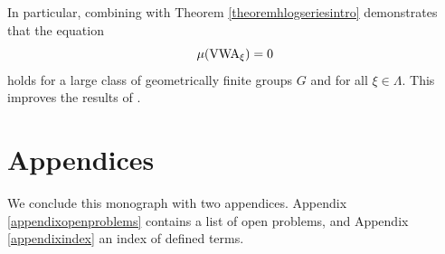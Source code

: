 In particular, combining with Theorem \ref{theoremhlogseriesintro} demonstrates that the equation 
\[
\mu(\mathrm{VWA}_\xi) = 0
\] 
holds for a large class of geometrically finite groups $G$ and for all $\xi\in\Lambda$. This improves the results of \cite[.3]{FSU4}.

\section{Appendices}

We conclude this monograph with two appendices. Appendix \ref{appendixopenproblems} contains a list of open problems, and Appendix \ref{appendixindex} an index of defined terms.


\endinput